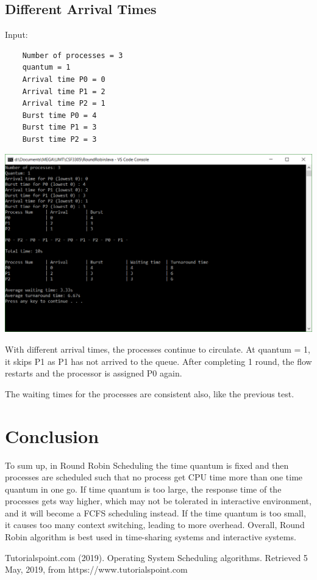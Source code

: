 \documentclass[12pt]{article}
\begin{document}
\subsection{Different Arrival Times}

Input:

\begin{verbatim}
	Number of processes = 3
	quantum = 1
	Arrival time P0 = 0
	Arrival time P1 = 2
	Arrival time P2 = 1
	Burst time P0 = 4
	Burst time P1 = 3
	Burst time P2 = 3
\end{verbatim}

\includegraphics[scale = 0.5]{quantum1_output.png}

With different arrival times, the processes continue to circulate. At quantum =
1, it skips P1 as P1 has not arrived to the queue. After completing 1 round,
the flow restarts and the processor is assigned P0 again.

The waiting times for the processes are consistent also, like the previous test.


\newpage
\section{Conclusion}
To sum up, in Round Robin Scheduling the time quantum is fixed and then
processes are scheduled such that no process get CPU time more than one time
quantum in one go. If time quantum is too large, the response time of the
processes gets way higher, which may not be tolerated in interactive
environment, and it will become a FCFS scheduling instead. If the
time quantum is too small, it causes too many context switching, leading to more
overhead. Overall, Round Robin algorithm is best used in time-sharing systems
and interactive systems.


\newpage


Tutorialspoint.com (2019). Operating System Scheduling
algorithms. Retrieved 5 May, 2019, from https://www.tutorialspoint.com
\end{document}
